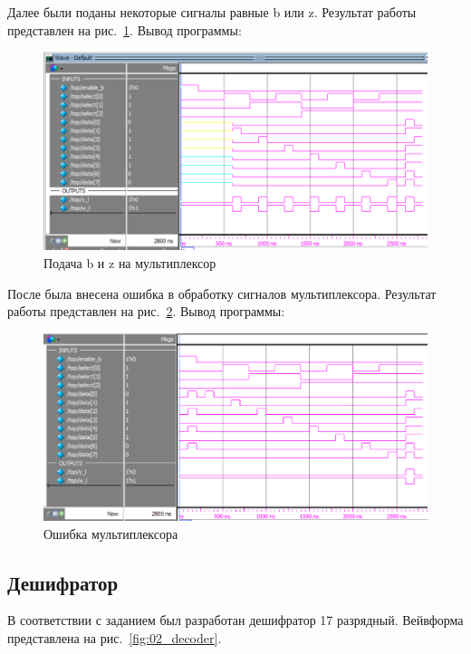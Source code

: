 \documentclass[a4paper,14pt]{article}
\begin{document}
    Далее были поданы некоторые сигналы равные b или z.
    Результат работы представлен на рис.~\ref{fig:02_mux_bz}.
    Вывод программы:
    {\small {}}
    
    \begin{figure}[H]
		\centering
		\includegraphics[width=\linewidth]{images/02_mux_bz}
		\caption{Подача b и z на мультиплексор}
		\label{fig:02_mux_bz}
	\end{figure}

    После была внесена ошибка в обработку сигналов мультиплексора.
	Результат работы представлен на рис.~\ref{fig:02_mux_error}.
	Вывод программы:
	{\small {}}

    \begin{figure}[H]
		\centering
		\includegraphics[width=\linewidth]{images/02_mux_error}
		\caption{Ошибка мультиплексора}
		\label{fig:02_mux_error}
	\end{figure}

	\subsection{Дешифратор}

	В соответствии с заданием был разработан дешифратор 17 разрядный.
	Вейвформа представлена на рис.~\ref{fig:02_decoder}.
	
\end{document}
